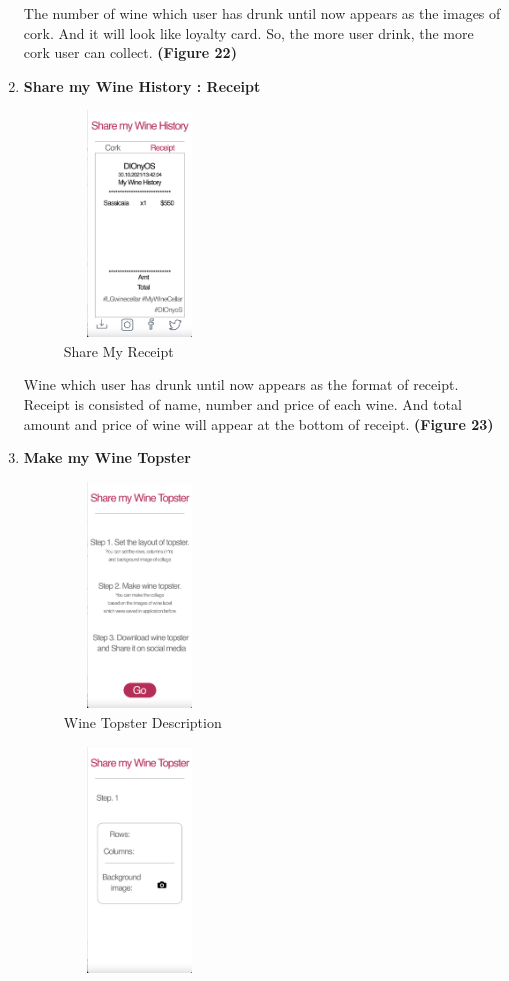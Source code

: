\documentclass[sigconf, nonacm]{acmart}
\begin{document}
\begin{enumerate}
\begin{figure}
\end{figure}
    The number of wine which user has drunk
until now appears as the images of cork. And
it will look like loyalty card. So, the more user
drink, the more cork user can collect. 
\textbf{(Figure 22)}
    \item \textbf{Share my Wine History : Receipt}\\
     \begin{figure}
  \centering
  \includegraphics[width=4cm, height=6cm]{sharerec.png}
  \caption{Share My Receipt}
  \label{fig:wine arrival}
\end{figure}
    Wine which user has drunk until now appears
as the format of receipt. Receipt is consisted
of name, number and price of each wine. And
total amount and price of wine will appear at
the bottom of receipt. 
\textbf{(Figure 23)}
    \item \textbf{Make my Wine Topster}\\
     \begin{figure}
  \centering
  \includegraphics[width=4cm, height=6cm]{sharetop.png}
  \caption{Wine Topster Description}
  \label{fig:wine topster 0}
\end{figure}
\begin{figure}
  \centering
  \includegraphics[width=4cm, height=6cm]{top1.png}

\end{figure}
\end{enumerate}
\end{document}
